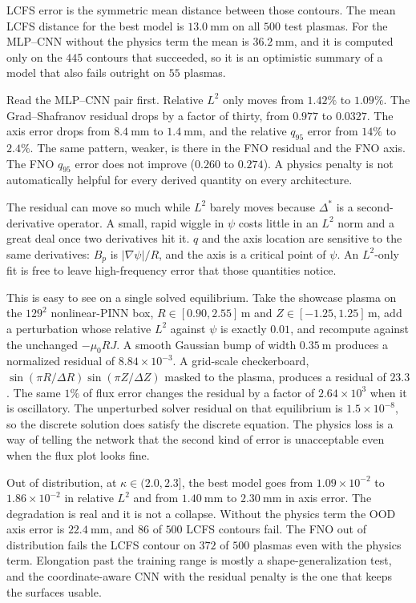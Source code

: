 \documentclass[11pt,a4paper,oneside,openany]{book}
\newcommand{\code}{\path}
\numberwithin{equation}{chapter}
\newcommand{\Dstar}{\Delta^{*}}
\newcommand{\grad}{\nabla}
\theoremstyle{definition}
\begin{document}
LCFS error is the symmetric mean distance between those contours. The mean LCFS distance for the best model is \(\qty{13.0}{\milli\metre}\) on all \(500\) test plasmas. For the MLP--CNN without the physics term the mean is \(\qty{36.2}{\milli\metre}\), and it is computed only on the \(445\) contours that succeeded, so it is an optimistic summary of a model that also fails outright on \(55\) plasmas.

Read the MLP--CNN pair first. Relative \(L^{2}\) only moves from \(1.42\%\) to \(1.09\%\). The Grad--Shafranov residual drops by a factor of thirty, from \(0.977\) to \(0.0327\). The axis error drops from \(\qty{8.4}{\milli\metre}\) to \(\qty{1.4}{\milli\metre}\), and the relative \(q_{95}\) error from \(14\%\) to \(2.4\%\). The same pattern, weaker, is there in the FNO residual and the FNO axis. The FNO \(q_{95}\) error does not improve (\(0.260\) to \(0.274\)). A physics penalty is not automatically helpful for every derived quantity on every architecture.

The residual can move so much while \(L^{2}\) barely moves because \(\Dstar\) is a second-derivative operator. A small, rapid wiggle in \(\psi\) costs little in an \(L^{2}\) norm and a great deal once two derivatives hit it. \(q\) and the axis location are sensitive to the same derivatives: \(B_{p}\) is \(\lvert\grad\psi\rvert/R\), and the axis is a critical point of \(\psi\). An \(L^{2}\)-only fit is free to leave high-frequency error that those quantities notice.

This is easy to see on a single solved equilibrium. Take the showcase plasma on the \(129^{2}\) nonlinear-PINN box, \(R\in[0.90,2.55]\,\mathrm{m}\) and \(Z\in[-1.25,1.25]\,\mathrm{m}\), add a perturbation whose relative \(L^{2}\) against \(\psi\) is exactly \(0.01\), and recompute \code{eval.metrics.gs_residual} against the unchanged \(-\mu_{0} R J\). A smooth Gaussian bump of width \(\qty{0.35}{\metre}\) produces a normalized residual of \(8.84\times 10^{-3}\). A grid-scale checkerboard, \(\sin(\pi R/\Delta R)\sin(\pi Z/\Delta Z)\) masked to the plasma, produces a residual of \(23.3\). The same \(1\%\) of flux error changes the residual by a factor of \(2.64\times 10^{3}\) when it is oscillatory. The unperturbed solver residual on that equilibrium is \(1.5\times 10^{-8}\), so the discrete solution does satisfy the discrete equation. The physics loss is a way of telling the network that the second kind of error is unacceptable even when the flux plot looks fine.

Out of distribution, at \(\kappa\in(2.0,2.3]\), the best model goes from \(1.09\times 10^{-2}\) to \(1.86\times 10^{-2}\) in relative \(L^{2}\) and from \(\qty{1.40}{\milli\metre}\) to \(\qty{2.30}{\milli\metre}\) in axis error. The degradation is real and it is not a collapse. Without the physics term the OOD axis error is \(\qty{22.4}{\milli\metre}\), and \(86\) of \(500\) LCFS contours fail. The FNO out of distribution fails the LCFS contour on \(372\) of \(500\) plasmas even with the physics term. Elongation past the training range is mostly a shape-generalization test, and the coordinate-aware CNN with the residual penalty is the one that keeps the surfaces usable.
\end{document}
